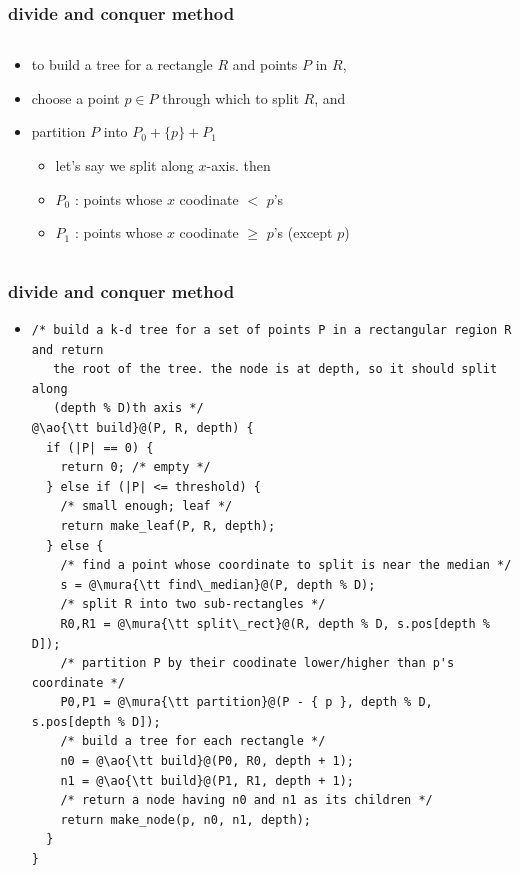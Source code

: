 \documentclass[12pt,dvipdfmx]{beamer}
\newcommand{\mura}[1]{{\color{purple}#1}}
\newcommand{\ao}[1]{{\color{blue}#1}}
\begin{document}
\begin{frame}
\frametitle{divide and conquer method}
\begin{columns}
\begin{column}{0.5\textwidth}
\begin{itemize}
\item<1-> to build a tree for a rectangle $R$ and points $P$ in $R$,
\item<2-> choose a point $p \in P$ through which to split $R$, and
\item<3-> partition $P$ into $P_0 + \{ p \} + P_1$
  \begin{itemize}
  \item let's say we split along $x$-axis. then
  \item $P_0$ : points whose $x$ coodinate $<$ $p$'s
  \item $P_1$ : points whose $x$ coodinate $\geq$ $p$'s (except $p$)
  \end{itemize}
\end{itemize}
\end{column}
  
\begin{column}{0.5\textwidth}
\begin{center}
\def\svgwidth{\columnwidth}
%
\only<2>{}%
\end{center}
\end{column}

\end{columns}

\end{frame}

\begin{frame}[fragile]
\frametitle{divide and conquer method}
\begin{itemize}
\item []
\begin{lstlisting}
/* build a k-d tree for a set of points P in a rectangular region R and return 
   the root of the tree. the node is at depth, so it should split along 
   (depth % D)th axis */
@\ao{\tt build}@(P, R, depth) {
  if (|P| == 0) {
    return 0; /* empty */
  } else if (|P| <= threshold) {
    /* small enough; leaf */
    return make_leaf(P, R, depth);
  } else {
    /* find a point whose coordinate to split is near the median */
    s = @\mura{\tt find\_median}@(P, depth % D);
    /* split R into two sub-rectangles */
    R0,R1 = @\mura{\tt split\_rect}@(R, depth % D, s.pos[depth % D]);
    /* partition P by their coodinate lower/higher than p's coordinate */
    P0,P1 = @\mura{\tt partition}@(P - { p }, depth % D, s.pos[depth % D]);
    /* build a tree for each rectangle */
    n0 = @\ao{\tt build}@(P0, R0, depth + 1);
    n1 = @\ao{\tt build}@(P1, R1, depth + 1);
    /* return a node having n0 and n1 as its children */
    return make_node(p, n0, n1, depth);
  }
}
\end{lstlisting}
\end{itemize}
\end{frame}
\end{document}
